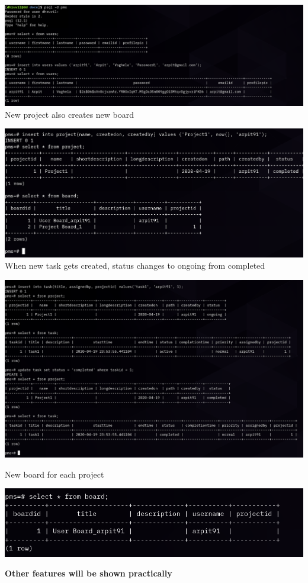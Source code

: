 \documentclass[conference,onecolumn]{IEEEtran}
\begin{document}
\includegraphics[scale=0.25]{./create_has.png}
\newpage
New project also creates new board

\includegraphics[scale=0.25]{./project0.png}
\newpage
When new task gets created, status changes to ongoing from completed

\includegraphics[scale=0.25]{./project1.png}

\newpage
New board for each project

\includegraphics[scale=0.25]{./insert_board.png}

\textbf{Other features will be shown practically}
\end{document}
